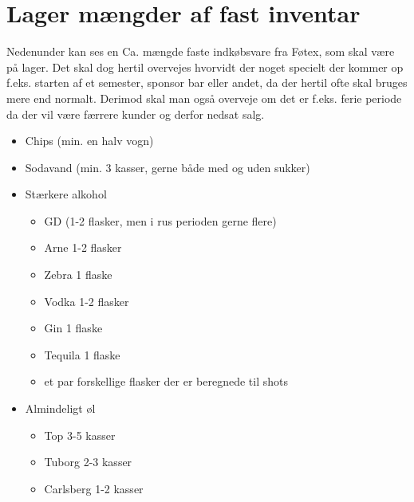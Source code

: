 \section{Lager mængder af fast inventar}
Nedenunder kan ses en Ca. mængde faste indkøbsvare fra Føtex, som skal være på lager. Det skal dog hertil overvejes hvorvidt der noget specielt der kommer op f.eks. starten af et semester, sponsor bar eller andet, da der hertil ofte skal bruges mere end normalt. Derimod skal man også overveje om det er f.eks. ferie periode da der vil være færrere kunder og derfor nedsat salg.
\begin{itemize}
    \item Chips (min. en halv vogn)
    \item Sodavand (min. 3 kasser, gerne både med og uden sukker)
    \item Stærkere alkohol
    \begin{itemize}
        \item GD (1-2 flasker, men i rus perioden gerne flere)
        \item Arne 1-2 flasker
        \item Zebra 1 flaske
        \item Vodka 1-2 flasker
        \item Gin 1 flaske
        \item Tequila 1 flaske
        \item et par forskellige flasker der er beregnede til shots
    \end{itemize}
    \item Almindeligt øl
    \begin{itemize}
        \item Top 3-5 kasser 
        \item Tuborg 2-3 kasser
        \item Carlsberg 1-2 kasser
    \end{itemize}
\end{itemize}

